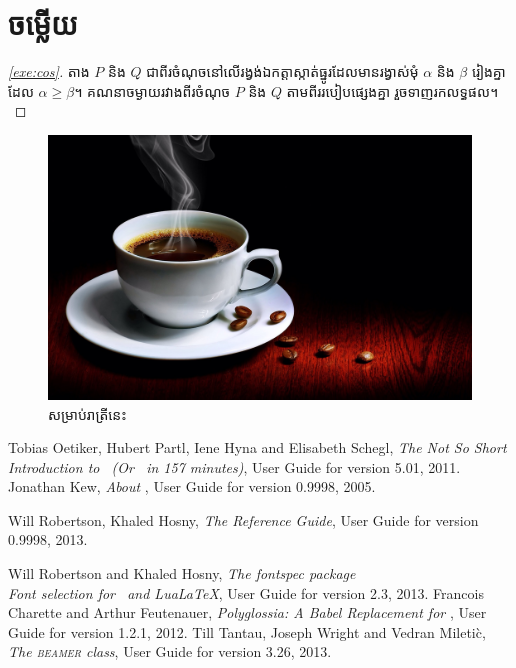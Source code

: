 \documentclass[12pt]{book}
\begin{document}
	\chapter{ចម្លើយ}\label{cha:ans}
	\begin{proof}[\ref{exe:cos}]
		តាង $ P $ និង $ Q $ ជាពីរចំណុចនៅលើរង្វង់ឯកត្តាស្កាត់ធ្នូរដែលមានរង្វាស់មុំ $ \alpha $ និង $ \beta $ រៀងគ្នាដែល $ \alpha\geq\beta $។ គណនាចម្ងាយរវាងពីរចំណុច $ P $ និង $ Q $ តាមពីររបៀបផ្សេងគ្នា រួចទាញរកលទ្ធផល។
	\end{proof}
	\begin{figure}[H]
		\includegraphics[width=\textwidth]{coffee.JPG}
		\caption{សម្រាប់រាត្រីនេះ}
	\end{figure}
	\backmatter
	\begin{thebibliography}{9}
		 Tobias Oetiker, Hubert Partl, Iene Hyna and Elisabeth Schegl,
		\newblock \emph{The Not So Short Introduction to \LaTeXe\ (Or \LaTeXe\ in 157 minutes)},
		\newblock User Guide for version 5.01, 2011.
		Jonathan Kew,
		\newblock \emph{About \XeTeX},
		\newblock User Guide for version 0.9998, 2005.
		
		 Will Robertson, Khaled Hosny,
		\newblock \emph{The \XeTeX{} Reference Guide},
		\newblock User Guide for version 0.9998, 2013.
		
		 Will Robertson and Khaled Hosny,
		\newblock \emph{The \emph{fontspec} package\\ Font selection for \XeLaTeX\ and Lua\LaTeX},
		\newblock User Guide for version 2.3, 2013.
		 Francois Charette and Arthur Feutenauer,
		\newblock \emph{Polyglossia: A Babel Replacement for \XeLaTeX},
		\newblock User Guide for version 1.2.1, 2012.
		 Till Tantau, Joseph Wright and Vedran Mileti\`c,
		\newblock \emph{The \textsc{beamer} \textit{class}},
		\newblock User Guide for version 3.26, 2013.
	\end{thebibliography}
\end{document}
